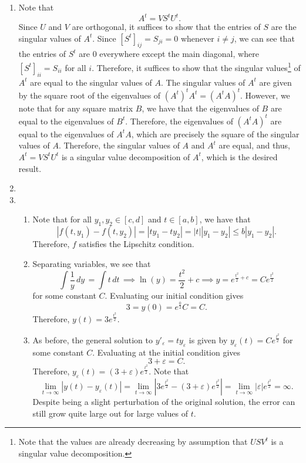 \documentclass[12pt]{article}
\begin{document}
\begin{enumerate}[leftmargin=0em]
    \item
    Note that
    \[A^{t} = VS^{t}U^{t}.\]
    Since $U$ and $V$ are orthogonal, it suffices to show that the entries of $S$ are the singular values of $A^{t}$. Since ${[S^{t}]}_{ij} = S_{ji} = 0$ whenever $i\neq j$, we can see that the entries of $S^{t}$ are $0$ everywhere except the main diagonal, where ${[S^{t}]}_{ii} = S_{ii}$ for all $i$. Therefore, 
    it suffices to show that the singular values\footnote{Note that the values are already decreasing by assumption that $USV^{t}$ is a singular value decomposition.} of $A^{t}$ are equal to the singular values of $A$. The singular values of $A^{t}$ are given by the square root of the eigenvalues of ${(A^{t})}^{t}A^{t} = {(A^{t}A)}^{t}$. However, we note that for any square matrix $B$, we have that the eigenvalues of $B$ are equal to the eigenvalues of $B^{t}$. Therefore, the eigenvalues of ${(A^{t}A)}^{t}$ are equal to the eigenvalues of
    $A^{t}A$, which are precisely the square of the singular values of $A$. Therefore, the singular values of $A$ and $A^{t}$ are equal, and thus, $A^{t} = VS^{t}U^{t}$ is a singular value decomposition of $A^{t}$, which is the desired result.

    \item 

    \item
    \begin{enumerate}[leftmargin=!]
        \item 
        Note that for all $y_1,y_2\in [c,d]$ and $t\in [a,b]$, we have that
        \[|f(t,y_1)-f(t,y_2)| = |ty_{1}-ty_{2}| = |t||y_{1}-y_{2}|\leq b|y_{1}-y_{2}|.\]
        Therefore, $f$ satisfies the Lipschitz condition.

        \item
        Separating variables, we see that
        \[\int\frac{1}{y}\, dy\, = \int t\, dt\, \implies \ln(y) = \frac{t^2}{2}+c \implies y = e^{\frac{t^2}{2}+c} = Ce^{\frac{t^2}{2}}\]
        for some constant $C$. Evaluating our initial condition gives
        \[3=y(0) = e^{\frac{0}{2}}C=C.\]
        Therefore, $y(t) = 3e^{\frac{t^2}{2}}$.

        \item
        As before, the general solution to $y'_{\varepsilon} = ty_{\varepsilon}$ is given by $y_{\varepsilon}(t) = Ce^{\frac{t^2}{2}}$ for some constant $C$. Evaluating at the initial condition gives
        \[3+\varepsilon = C.\]
        Therefore, $y_{\varepsilon}(t) = (3+\varepsilon)e^{\frac{t^2}{2}}$. Note that
        \[\lim_{t \to \infty} |y(t)-y_{\varepsilon}(t)| = \lim_{t\to \infty} \left|3e^{\frac{t^2}{2}}-(3+\varepsilon)e^{\frac{t^2}{2}}\right| = \lim_{t\to \infty} \left|\varepsilon\right|e^{\frac{t^2}{2}}= \infty.\]
        Despite being a slight perturbation of the original solution, the error can still grow quite large out for large values of $t$. 
    \end{enumerate}
\end{enumerate}
\end{document}
